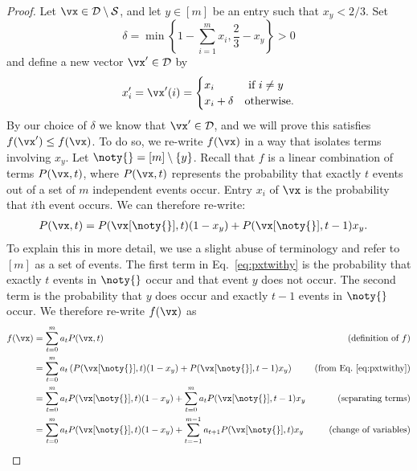 \begin{proof}
	Let $\vx \in \mathcal{D} \setminus \mathcal{S}$, and let $y \in  [m]$ be an entry such that $x_y < 2/3$. Set 
	\begin{equation*}
	\delta = \min \left\{ 1 - \sum_{i = 1}^m x_i, \frac{2}{3}- x_y\right\} > 0
	\end{equation*} and define a new vector $\vx' \in \mathcal{D}$ by
	\begin{equation}
		x_i' = \vx'(i) = \begin{cases}
			x_i          & \text{ if $i \neq y$} \\
			x_i + \delta & \text{otherwise}.
		\end{cases}
	\end{equation}
	By our choice of $\delta$ we know that $\vx' \in \mathcal{D}$, and we will prove this satisfies $f(\vx') \leq f(\vx)$. To do so, we re-write $f(\vx)$ in a way that isolates terms involving $x_y.$ Let $\noty{} = [m] \setminus \{y\}$. Recall that $f$ is a linear combination of terms $P(\vx,t)$, where $P(\vx,t)$ represents the probability that exactly $t$ events out of a set of $m$ independent events occur. Entry $x_i$ of $\vx$ is the probability that $i$th event occurs. We can therefore re-write:
	\begin{align}
		\label{eq:pxtwithy}
		P(\vx,t) & = P(\vx[\noty{}],t) (1-x_y) + P(\vx[\noty{}], t-1) x_y.
	\end{align}
	To explain this in more detail, we use a slight abuse of terminology and refer to $[m]$ as a set of events. The first term in Eq.~\eqref{eq:pxtwithy} is the probability that exactly $t$ events in $\noty{}$ occur and that event $y$ does not occur. The second term is the probability that $y$ does occur and exactly $t -1$ events in $\noty{}$ occur. We therefore re-write $f(\vx)$ as
	\begin{align}
		f(\vx) & = \sum_{t=0}^m a_t P(\vx, t)                                                                       & (\text{definition of $f$}) \notag            \\
		       & = \sum_{t=0}^m a_t \left(P(\vx[\noty{}],t) (1-x_y) + P(\vx[\noty{}], t-1) x_y \right)              & (\text{from Eq.~\eqref{eq:pxtwithy}}) \notag \\
		       & = \sum_{t=0}^m a_t P(\vx[\noty{}],t) (1-x_y) + \sum_{t=0}^m a_t P(\vx[\noty{}], t-1) x_y           & (\text{separating terms}) \notag             \\
		       & = \sum_{t=0}^m a_t P(\vx[\noty{}],t) (1-x_y) + \sum_{t=-1}^{m-1} a_{t+1} P(\vx[\noty{}], t) x_y    & (\text{change of variables}) \notag          \\

\end{align}
\end{proof}
